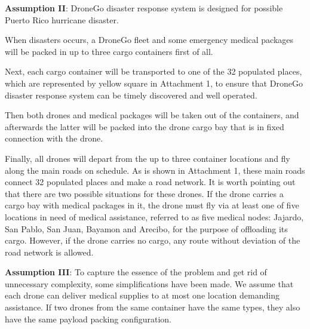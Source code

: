 \documentclass{mcmthesis}
\begin{document}
\noindent\textbf{Assumption II}: DroneGo disaster response system is designed for possible Puerto Rico hurricane disaster. 

\noindent When disasters occurs, a DroneGo fleet and some emergency medical packages will be packed in up to three cargo containers first of all. 

\noindent Next, each cargo container will be transported to one of the 32 populated places, which are represented by yellow square in Attachment 1, to ensure that DroneGo disaster response system can be timely discovered and well operated. 

\noindent Then both drones and medical packages will be taken out of the containers, and afterwards the latter will be packed into the drone cargo bay that is in fixed connection with the drone. 

\noindent Finally, all drones will depart from the up to three container locations and fly along the main roads on schedule. As is shown in Attachment 1, these main roads connect 32 populated places and make a road network. It is worth pointing out that there are two possible situations for these drones. If the drone carries a cargo bay with medical packages in it, the drone must fly via at least one of five locations in need of medical assistance, referred to as five medical nodes: Jajardo, San Pablo, San Juan, Bayamon and Arecibo, for the purpose of offloading its cargo. However, if the drone carries no cargo, any route without deviation of the road network is allowed.

\noindent\textbf{Assumption III}: To capture the essence of the problem and get rid of unnecessary complexity, some simplifications have been made. We assume that each drone can deliver medical supplies to at most one location demanding assistance. If two drones from the same container have the same types, they also have the same payload packing configuration.
\end{document}
